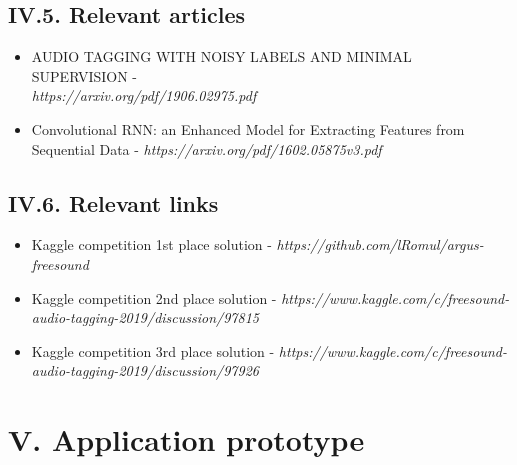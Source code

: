 \documentclass[11pt, a4papper]{report}
\theoremstyle{plain}
\theoremstyle{definition}
\theoremstyle{definition}
\theoremstyle{proposition}
\begin{document}
\section*{IV.5. Relevant articles}

\begin{itemize}
\item AUDIO TAGGING WITH NOISY LABELS AND MINIMAL SUPERVISION - \\ \textit{https://arxiv.org/pdf/1906.02975.pdf}
\item Convolutional RNN: an Enhanced Model for
Extracting Features from Sequential Data - \textit{https://arxiv.org/pdf/1602.05875v3.pdf}
\end{itemize}

\section*{IV.6. Relevant links}

\begin{itemize}
\item Kaggle competition 1st place solution - \textit{https://github.com/lRomul/argus-freesound}
\item Kaggle competition 2nd place solution - \textit{https://www.kaggle.com/c/freesound-audio-tagging-2019/discussion/97815}
\item Kaggle competition 3rd place solution - \textit{https://www.kaggle.com/c/freesound-audio-tagging-2019/discussion/97926}
\end{itemize}




\chapter*{V. Application prototype}
\

\end{document}
